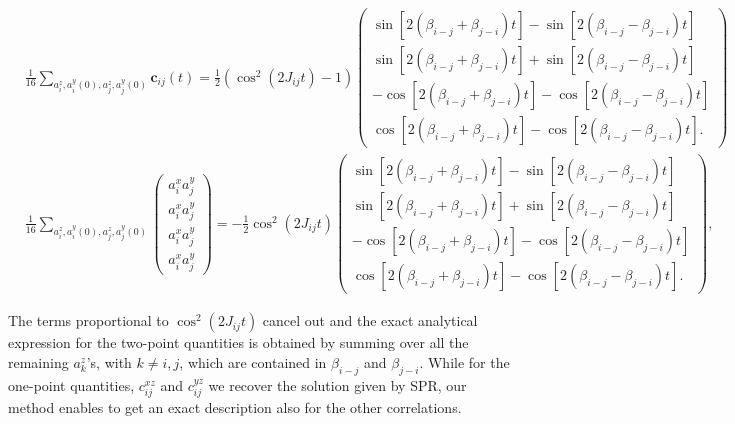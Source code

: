 \documentclass[aps,prl,showpacs,amsmath,amssymb,superscriptaddress,reprint,10pt]{revtex4-1}
\newcommand{\mvec}[1]{\boldsymbol #1}
\begin{document}
\begin{widetext}
\begin{subequations}
\begin{align}
 &\frac{1}{16}\sum_{a_i^z,a_i^y(0),a_j^z,a_j^y(0)}\mvec{c_{ij}}(t)=
 \frac{1}{2}(\cos^2(2J_{ij}t)-1)\left(\begin{array}{c}
        \sin\left[2(\beta_{i-j}+\beta_{j-i})t\right]-\sin\left[2(\beta_{i-j}-\beta_{j-i})t\right]\\
        \sin\left[2(\beta_{i-j}+\beta_{j-i})t\right]+\sin\left[2(\beta_{i-j}-\beta_{j-i})t\right]\\
        -\cos\left[2(\beta_{i-j}+\beta_{j-i})t\right]-\cos\left[2(\beta_{i-j}-\beta_{j-i})t\right]\\
        \cos\left[2(\beta_{i-j}+\beta_{j-i})t\right]-\cos\left[2(\beta_{i-j}-\beta_{j-i})t\right].
       \end{array}
 \right)\\
 &\frac{1}{16}\sum_{a_i^z,a_i^y(0),a_j^z,a_j^y(0)}
 \left(\begin{array}{c}
 a_i^xa_j^y\\
 a_i^xa_j^y\\
 a_i^xa_j^y\\
 a_i^xa_j^y
 \end{array}\right)
=
 -\frac{1}{2}\cos^2(2J_{ij}t)\left(\begin{array}{c}
        \sin\left[2(\beta_{i-j}+\beta_{j-i})t\right]-\sin\left[2(\beta_{i-j}-\beta_{j-i})t\right]\\
        \sin\left[2(\beta_{i-j}+\beta_{j-i})t\right]+\sin\left[2(\beta_{i-j}-\beta_{j-i})t\right]\\
        -\cos\left[2(\beta_{i-j}+\beta_{j-i})t\right]-\cos\left[2(\beta_{i-j}-\beta_{j-i})t\right]\\
        \cos\left[2(\beta_{i-j}+\beta_{j-i})t\right]-\cos\left[2(\beta_{i-j}-\beta_{j-i})t\right].
       \end{array}
 \right),
\end{align}
\end{subequations}
\end{widetext}
The terms proportional to $\cos^2(2J_{ij}t)$ cancel out and the exact analytical expression for the two-point quantities is obtained
by summing over all the remaining $a_k^z$'s, with $k\neq i,j$, which are contained in $\beta_{i-j}$ and $\beta_{j-i}$.
While for the one-point quantities, $c_{ij}^{xz}$ and $c_{ij}^{yz}$ we recover the solution given by SPR,
 our method enables to get an exact description also for the other correlations.

%
\end{document}
